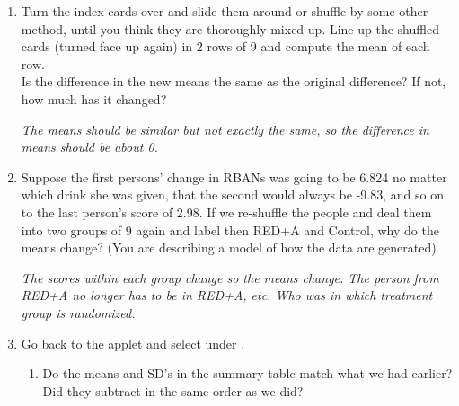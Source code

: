 \begin{enumerate}
\begin{key}
  {\it   Random variation}
\end{key}

\item  Turn the index cards over and slide them around or shuffle by
  some other method, until you think they are thoroughly mixed up.
  Line up the shuffled cards (turned face up again) in 2 rows of 9 and
  compute the mean of each row. 
  \vspace{1cm} \\

  Is the difference in the new means  the same as the original
  difference?   If not,  how much has it changed? 
\begin{students}
    \vspace{3cm}    
\end{students}

\begin{key}
  {\it  The means should be similar but not exactly the same, so the
    difference in means should be about 0.}
\end{key}


\item  Suppose the first persons' change in RBANs was going to be
  6.824 no matter which drink she was given, that the second would
  always be -9.83, and so on to the last person's score of 2.98.  If
  we re-shuffle the people and deal them into two groups of 9 again
  and label then  RED+A and Control, why do the means change? (You
  are describing a model of how the data are generated) 
\begin{students}
    \vspace{5cm}    
\end{students}

\begin{key}
  {\it     The scores within each group change so the means change.  The person
  from RED+A no longer has to be in RED+A, etc.  Who was in which
  treatment group is randomized. 
}
\end{key}


 \item  Go back to the applet and select  under .
   \begin{enumerate}
   \item 
   Do the means and SD's in the summary table match what we had
   earlier?  Did they subtract in the same order as we did?
\begin{students}
    \vspace{1cm}    
\end{students}


\end{enumerate}
\end{enumerate}
